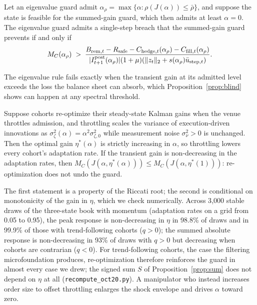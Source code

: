 \begin{proposition}\label{prop:dominance}
Let an eigenvalue guard admit $\alpha_\rho=\max\{\alpha:\rho(J(\alpha))\le\bar\rho\}$, and suppose the state is feasible for the summed-gain guard, which then admits at least $\alpha=0$. The eigenvalue guard admits a single-step breach that the summed-gain guard prevents if and only if
\[
M_C(\alpha_\rho)\;>\;\frac{B_{{\rm rem},t}-R_{\rm safe}-C_{{\rm hedge},t}(\alpha_\rho)-C_{{\rm fill},t}(\alpha_\rho)}{|I^{\rm post}_{t+1}(\alpha_\rho)|(1+\mu)(\|z_t\|_2+s(\alpha_\rho)\bar u_{{\rm step},t})} .
\]
\end{proposition}

The eigenvalue rule fails exactly when the transient gain at its admitted level exceeds the loss the balance sheet can absorb, which Proposition~\ref{prop:blind} shows can happen at any spectral threshold.

\begin{proposition}\label{prop:lucas}
Suppose cohorts re-optimize their steady-state Kalman gains when the venue throttles admission, and throttling scales the variance of execution-driven innovations as $\sigma_\zeta^2(\alpha)=\alpha^2\sigma_{\zeta,0}^2$ while measurement noise $\sigma_\nu^2>0$ is unchanged. Then the optimal gain $\eta^*(\alpha)$ is strictly increasing in $\alpha$, so throttling lowers every cohort's adaptation rate. If the transient gain is non-decreasing in the adaptation rates, then $M_C(J(\alpha,\eta^*(\alpha)))\le M_C(J(\alpha,\eta^*(1)))$: re-optimization does not undo the guard.
\end{proposition}

The first statement is a property of the Riccati root; the second is conditional on monotonicity of the gain in $\eta$, which we check numerically. Across 3{,}000 stable draws of the three-state book with momentum (adaptation rates on a grid from 0.05 to 0.95), the peak response is non-decreasing in $\eta$ in 98.8\% of draws and in 99.9\% of those with trend-following cohorts ($q>0$); the summed absolute response is non-decreasing in 93\% of draws with $q>0$ but decreasing when cohorts are contrarian ($q<0$). For trend-following cohorts, the case the filtering microfoundation produces, re-optimization therefore reinforces the guard in almost every case we drew; the signed sum $S$ of Proposition~\ref{prop:sum} does not depend on $\eta$ at all (\texttt{recompute\_oct20.py}). A manipulator who instead increases order size to offset throttling enlarges the shock envelope and drives $\alpha$ toward zero.
